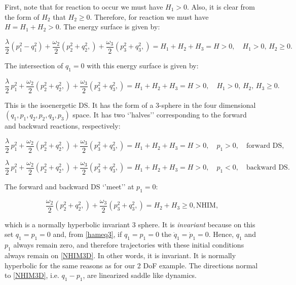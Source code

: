 \documentclass{article}
\begin{document}
First, note that for reaction to occur we must have $H_1 >0$. Also, it is clear  from  the form of $H_2$ that $H_2 \ge 0$. Therefore, for reaction we must have $H = H_1 + H_2 >0$. The energy surface is given by:

\begin{equation}
\frac{\lambda}{2} \left(p_1^2 - q_1^2 \right) + \frac{\omega_2}{2} \left(p_2^2 + q_2^2, \right)  + \frac{\omega_3}{2} \left(p_3^2 + q_3^2, \right)= H_1 + H_2+ H_3 = H > 0, \quad H_1 > 0, \, H_2 \ge 0.
\label{2DoFES}
\end{equation}

\noindent
The intersection of $q_1=0$ with this energy surface is given by:



\begin{equation}
\frac{\lambda}{2} \, p_1^2  + \frac{\omega_2}{2} \left(p_2^2 + q_2^2, \right) + \frac{\omega_3}{2} \left(p_3^2 + q_3^2, \right)= H_1 + H_2 + H_3= H > 0, \quad H_1 > 0, \, H_2, \, H_3 \ge 0.
\label{2DoDS}
\end{equation}

\noindent
This is the isoenergetic DS. It has the form of a 3-sphere in the four dimensional $(q_1, p_1, q_2, p_2, q_3, p_3)$ space. It has two `'halves'' corresponding to the forward and backward reactions, respectively:

\begin{equation}
\frac{\lambda}{2} \, p_1^2  + \frac{\omega_2}{2} \left(p_2^2 + q_2^2, \right)  + \frac{\omega_3}{2} \left(p_3^2 + q_3^2, \right)= H_1 + H_2  + H_3= H > 0, \quad p_1 >0, \quad \mbox{forward DS},
\end{equation}

\begin{equation}
\frac{\lambda}{2} \, p_1^2  + \frac{\omega_2}{2} \left(p_2^2 + q_2^2, \right)  + \frac{\omega_3}{2} \left(p_3^2 + q_3^2, \right)= H_1 + H_2  + H_3= H > 0, \quad p_1 <0, \quad \mbox{backward DS}.
\end{equation}

\noindent
The forward and backward DS `'meet'' at  $p_1 =0$:

\begin{equation}
 \frac{\omega_2}{2} \left(p_2^2 + q_2^2, \right) + \frac{\omega_3}{2} \left(p_3^2 + q_3^2, \right)= H_2 + H_3 \ge  0,   \mbox{NHIM},
 \label{NHIM3D}
\end{equation}

\noindent
which is a normally hyperbolic invariant 3 sphere. It is {\em invariant} because on this set $q_1 = p_1 =0$ and, from \eqref{hameq3}, if $q_1 = p_1 =0$ the $\dot{q}_1 = \dot{p}_1 =0$. Hence, $q_1$ and $p_1$ always remain zero, and therefore   trajectories with these initial conditions always remain on \eqref{NHIM3D}. In other words, it is invariant. It is normally hyperbolic for the same reasons as for our 2 DoF example. The directions normal to \eqref{NHIM3D}, i.e. $q_1-p_1$, are linearized saddle like dynamics.
\end{document}

